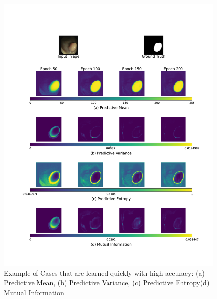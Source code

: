 \documentclass[10pt, a4paper, twocolumn]{jarticle}
\begin{document}
\begin{figure}[t] %
  \begin{center}
    \includegraphics[scale=0.25]{figure/fold5_file144_uncertainty_evolution.pdf}
    \caption{Example of Cases that are learned quickly with high accuracy:
    (a) Predictive Mean, (b) Predictive Variance,
    (c) Predictive Entropy(d) Mutual Information}
    \label{fold5_file144}
  \end{center}
\end{figure}
\end{document}
